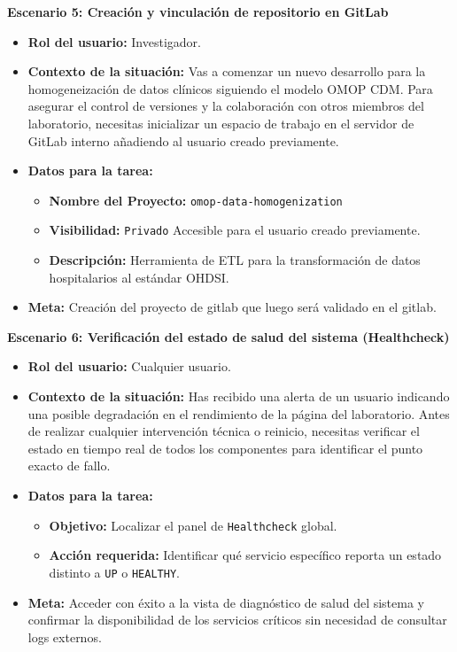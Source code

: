 \noindent\textbf{Escenario 5: Creación y vinculación de repositorio en GitLab}
\begin{itemize}
    \item \textbf{Rol del usuario:} Investigador.
    \item \textbf{Contexto de la situación:} 
    Vas a comenzar un nuevo desarrollo para la homogeneización de datos clínicos siguiendo el modelo OMOP CDM. Para asegurar el control de versiones y la colaboración con otros miembros del laboratorio, necesitas inicializar un espacio de trabajo en el servidor de GitLab interno añadiendo al usuario creado previamente.
    
    \item \textbf{Datos para la tarea:}
        \begin{itemize}
            \item \textbf{Nombre del Proyecto:} \texttt{omop-data-homogenization}
            \item \textbf{Visibilidad:} \texttt{Privado} Accesible para el usuario creado previamente.
            \item \textbf{Descripción:} Herramienta de ETL para la transformación de datos hospitalarios al estándar OHDSI.
        \end{itemize}
    \item \textbf{Meta:} Creación del proyecto de gitlab que luego será validado en el gitlab.

\end{itemize}

\noindent\textbf{Escenario 6: Verificación del estado de salud del sistema (Healthcheck)}
\begin{itemize}
    \item \textbf{Rol del usuario:} Cualquier usuario.
    \item \textbf{Contexto de la situación:} 
    Has recibido una alerta de un usuario indicando una posible degradación en el rendimiento de la página del laboratorio. Antes de realizar cualquier intervención técnica o reinicio, necesitas verificar el estado en tiempo real de todos los componentes para identificar el punto exacto de fallo.
    
    \item \textbf{Datos para la tarea:}
        \begin{itemize}
            \item \textbf{Objetivo:} Localizar el panel de \texttt{Healthcheck} global.
            \item \textbf{Acción requerida:} Identificar qué servicio específico reporta un estado distinto a \texttt{UP} o \texttt{HEALTHY}.
        \end{itemize}
    \item \textbf{Meta:} 
    Acceder con éxito a la vista de diagnóstico de salud del sistema y confirmar la disponibilidad de los servicios críticos sin necesidad de consultar logs externos.
\end{itemize}

